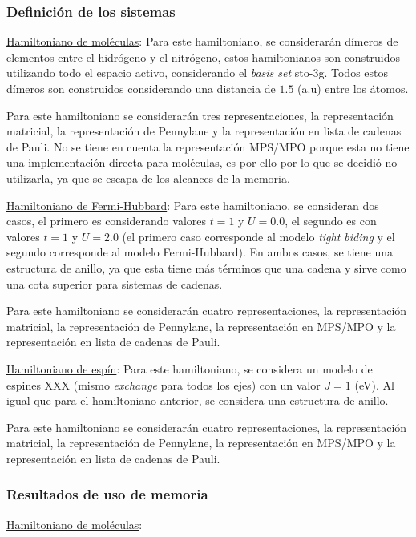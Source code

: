 \subsubsection{Definición de los sistemas}

\underline{Hamiltoniano de moléculas}:
Para este hamiltoniano, se considerarán dímeros de elementos entre el hidrógeno y el nitrógeno, estos hamiltonianos son construidos utilizando todo el espacio activo, considerando el \textit{basis set} sto-3g. Todos estos dímeros son construidos considerando una distancia de $1.5$ (a.u) entre los átomos.

Para este hamiltoniano se considerarán tres representaciones, la representación matricial, la representación de Pennylane y la representación en lista de cadenas de Pauli. No se tiene en cuenta la representación MPS/MPO porque esta no tiene una implementación directa para moléculas, es por ello por lo que se decidió no utilizarla, ya que se escapa de los alcances de la memoria.

\underline{Hamiltoniano de Fermi-Hubbard}:
Para este hamiltoniano, se consideran dos casos, el primero es considerando valores $t=1$ y $U=0.0$, el segundo es con valores $t=1$ y $U=2.0$ (el primero caso corresponde al modelo \textit{tight biding} y el segundo corresponde al modelo Fermi-Hubbard). En ambos casos, se tiene una estructura de anillo, ya que esta tiene más términos que una cadena y sirve como una cota superior para sistemas de cadenas.

Para este hamiltoniano se considerarán cuatro representaciones, la representación matricial, la representación de Pennylane, la representación en MPS/MPO y la representación en lista de cadenas de Pauli.

\underline{Hamiltoniano de espín}: 
Para este hamiltoniano, se considera un modelo de espines XXX (mismo \textit{exchange} para todos los ejes) con un valor $J=1$ (eV). Al igual que para el hamiltoniano anterior, se considera una estructura de anillo.

Para este hamiltoniano se considerarán cuatro representaciones, la representación matricial, la representación de Pennylane, la representación en MPS/MPO y la representación en lista de cadenas de Pauli.


\subsubsection{Resultados de uso de memoria}
\underline{Hamiltoniano de moléculas}:

